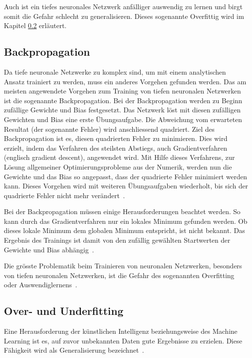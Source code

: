 Auch ist ein tiefes neuronales Netzwerk anfälliger auswendig zu lernen und birgt somit die Gefahr schlecht zu generalisieren. Dieses sogenannte Overfittig wird im Kapitel \ref{chap:overfitting} erläutert.

\subsection{Backpropagation}
\label{chap:backpropagation}

Da tiefe neuronale Netzwerke zu komplex sind, um mit einem analytischen Ansatz trainiert zu werden, muss ein anderes Vorgehen gefunden werden. Das am meisten angewendete Vorgehen zum Training von tiefen neuronalen Netzwerken ist die sogenannte Backpropagation. Bei der Backpropagation werden zu Beginn zufällige Gewichte und Bias festgesetzt. Das Netzwerk löst mit diesen zufälligen Gewichten und Bias eine erste Übungsaufgabe. Die Abweichung vom erwarteten Resultat (der sogenannte Fehler) wird anschliessend quadriert. Ziel des Backpropagation ist es, diesen quadrierten Fehler zu minimieren. Dies wird erzielt, indem das Verfahren des steilsten Abstiegs, auch Gradientverfahren (englisch gradient descent), angewendet wird. Mit Hilfe dieses Verfahrens, zur Lösung allgemeiner Optimierungsprobleme aus der Numerik, werden nun die Gewichte und das Bias so angepasst, dass der quadrierte Fehler minimiert werden kann. Dieses Vorgehen wird mit weiteren Übungsaufgaben wiederholt, bis sich der quadrierte Fehler nicht mehr verändert~\autocite{Krogh2008}.

Bei der Backpropagation müssen einige Herausforderungen beachtet werden. So kann durch das Gradientverfahren nur ein lokales Minimum gefunden werden. Ob dieses lokale Minimum dem globalen Minimum entspricht, ist nicht bekannt. Das Ergebnis des Trainings ist damit von den zufällig gewählten Startwerten der Gewichte und Bias abhängig~\autocite{Krogh2008}.

Die grösste Problematik beim Trainieren von neuronalen Netzwerken, besonders von tiefen neuronalen Netzwerken, ist die Gefahr des sogenannten Overfitting oder Auswendiglernens~\autocite{Krogh2008}.

\subsection{Over- und Underfitting}
\label{chap:overfitting}

Eine Herausforderung der künstlichen Intelligenz beziehungsweise des Machine Learning ist es, auf zuvor unbekannten Daten gute Ergebnisse zu erzielen. Diese Fähigkeit wird als Generalisierung bezeichnet~\autocite{Goodfellow2016}.

